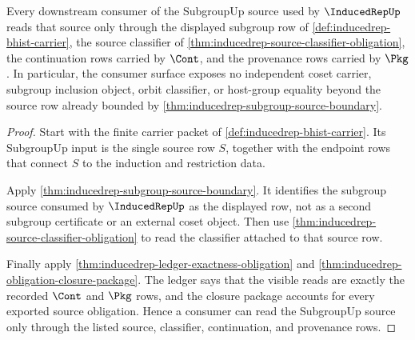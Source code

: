\begin{theorem}
\label{thm:inducedrep-subgroup-coset-source-scope}
Every downstream consumer of the SubgroupUp source used by
$\InducedRepUp$ reads that source only through the displayed subgroup row of
\autoref{def:inducedrep-bhist-carrier}, the source classifier of
\autoref{thm:inducedrep-source-classifier-obligation}, the continuation rows
carried by $\Cont$, and the provenance rows carried by $\Pkg$. In particular,
the consumer surface exposes no independent coset carrier, subgroup inclusion
object, orbit classifier, or host-group equality beyond the source row already
bounded by \autoref{thm:inducedrep-subgroup-source-boundary}.
\end{theorem}
\begin{proof}
Start with the finite carrier packet of
\autoref{def:inducedrep-bhist-carrier}. Its SubgroupUp input is the single
source row $S$, together with the endpoint rows that connect $S$ to the
induction and restriction data.

Apply \autoref{thm:inducedrep-subgroup-source-boundary}. It identifies the
subgroup source consumed by $\InducedRepUp$ as the displayed row, not as a
second subgroup certificate or an external coset object. Then use
\autoref{thm:inducedrep-source-classifier-obligation} to read the classifier
attached to that source row.

Finally apply \autoref{thm:inducedrep-ledger-exactness-obligation} and
\autoref{thm:inducedrep-obligation-closure-package}. The ledger says that the
visible reads are exactly the recorded $\Cont$ and $\Pkg$ rows, and the closure
package accounts for every exported source obligation. Hence a consumer can
read the SubgroupUp source only through the listed source, classifier,
continuation, and provenance rows.
\end{proof}


